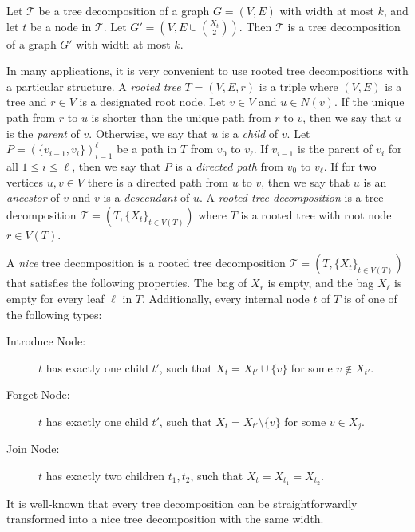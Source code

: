 \documentclass[a4paper,UKenglish,cleveref, autoref, thm-restate, numberwithinsect]{lipics-v2021}
\begin{document}
\begin{observation}\label{lem:cliquebag2}
Let $\mathcal{T}$ be a tree decomposition of a graph $G=(V,E)$ with width at most $k$, and let $t$ be a node in $\mathcal{T}$. Let $G'=(V,E\cup\binom{X_t}{2})$. 
Then $\mathcal{T}$ is a tree decomposition of a graph $G'$ with width at most $k$.
\end{observation}



In many applications, it is very convenient to use rooted tree decompositions with a particular structure. 
A \emph{rooted tree} $T=(V,E,r)$ is a triple where $(V,E)$ is a tree and $r\in V$ is a designated root node. Let $v\in V$ and $u\in N(v)$. If the unique path from $r$ to $u$ is shorter than the unique path from $r$ to $v$, then we say that $u$ is the \emph{parent} of $v$. Otherwise, we say that $u$ is a \emph{child} of $v$. Let $P=\left(\{v_{i-1},v_i\}\right)_{i=1}^\ell$ be a path in $T$ from $v_0$ to $v_\ell$. If $v_{i-1}$ is the parent of $v_i$ for all $1\le i\le \ell$, then we say that $P$ is a \emph{directed path} from $v_0$ to $v_\ell$. If for two vertices $u,v\in V$ there is a directed path from $u$ to $v$, then we say that $u$ is an \emph{ancestor} of $v$ and $v$ is a \emph{descendant} of $u$.
A {\em rooted tree decomposition} is a tree decomposition $\mathcal{T}=(T,\{X_t\}_{t\in V(T)})$ where $T$ is a rooted tree with root node $r\in V(T)$. 

\begin{definition}\label{def:nicetd}
    A {\em nice} tree decomposition is a rooted tree decomposition $\mathcal{T}=(T,\{X_t\}_{t\in V(T)})$ that satisfies the following properties. The bag of $X_r$ is empty, and the bag $X_\ell$ is empty for every leaf $\ell$ in $T$. Additionally, every internal node $t$ of $T$ is of one of the following types: 
\begin{description}
    \item[Introduce Node:] $t$ has exactly one child $t'$, such that $X_t=X_{t'}\cup \{v\}$ for some $v\notin X_{t'}$.
    \item[Forget Node:] $t$ has exactly one child $t'$, such that $X_t=X_{t'}\setminus \{v\}$ for some $v\in X_j$. 
    \item[Join Node:] $t$ has exactly two children $t_1, t_2$, such that $X_t=X_{t_1}=X_{t_2}$. 
\end{description}
\end{definition}

It is well-known that every tree decomposition can be straightforwardly transformed into a nice tree decomposition with the same width.
\end{document}
